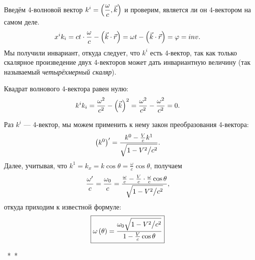     Введём 4-волновой вектор $\displaystyle k^i = \left({\frac{\omega}{c}, \vec{k}}\right)$ и проверим, является ли он 4-вектором на самом деле.
    \[
        x^ik_i = ct\cdot\frac{\omega}{c} - \left({\vec{k}\cdot\vec{r}}\right) = \omega t - \left({\vec{k}\cdot\vec{r}}\right) = \varphi = inv.
    \]
    Мы получили инвариант, откуда следует, что $k^i$ есть 4-вектор, так как только скалярное произведение двух 4-векторов может дать инвариантную величину
    (так называемый \textit{четырёхмерный скаляр}).
    \begin{note} Квадрат волнового 4-вектора равен нулю:
        \[
            k^ik_i = \frac{\omega^2}{c^2} - \left({\vec{k}}\right)^2 = \frac{\omega^2}{c^2} - \frac{\omega^2}{c^2} = 0.
        \]
    \end{note}
    Раз $k^i$ --- 4-вектор, мы можем применить к нему закон преобразования 4-вектора:
    \[
        \left({k^0}\right)' = \frac{k^0 - \frac{V}{c}k^1}{\sqrt{1 - V^2 \big/ c^2}}.
    \]
    Далее, учитывая, что $k^1 = k_x = k\cos\theta = \frac{\omega}{c}\cos\theta$, получаем
    \[
        \frac{\omega'}{c} = \frac{\omega_0}{c} = \frac{\frac{\omega}{c} - \frac{V}{c}\cdot\frac{\omega}{c} \cos\theta}{\sqrt{1 - V^2 \big/ c^2}},
    \]
    откуда приходим к известной формуле:
    \[
        \boxed{\omega\left({\theta}\right) = \frac{\omega_0\sqrt{1 - V^2 \big/ c^2}}{1 - \frac{V}{c}\cos\theta}}
    \]
    \vspace{0.6cm}
    \begin{center}
        {\Large *\ *\ *}
    \end{center}
    \vspace{0.6cm}
    \begin{figure}[h]
        \noindent{}
    \end{figure}
